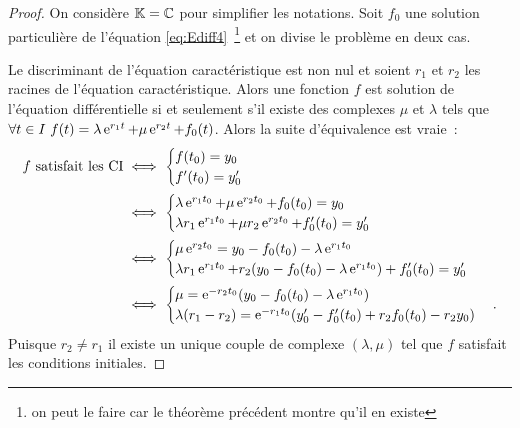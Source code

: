 \begin{proof}
On considère \(\mathbb{K}=\mathbb{C}\) pour simplifier les notations. Soit \(f_0\) une solution particulière de l'équation \eqref{eq:Ediff4}~\footnote{on peut le faire car le théorème précédent montre qu'il en existe} et on divise le problème en deux cas.

Le discriminant de l'équation caractéristique est non nul et soient \(r_1\) et \(r_2\) les racines de l'équation caractéristique. Alors une fonction \(f\) est solution de l'équation différentielle si et seulement s'il existe des complexes \(\mu\) et \(\lambda\) tels que \(\forall t \in I \ f(t)=\lambda \operatorname{e}^{r_1 t}+ \mu \operatorname{e}^{r_2 t} + f_0(t)\). Alors la suite d'équivalence est vraie~:
  \begin{align}
    f \text{~satisfait les CI} &\iff  \begin{cases}f(t_0)=y_0 \\ f'(t_0)=y'_0 \end{cases}\\
    &\iff  \begin{cases}\lambda \operatorname{e}^{r_1 t_0}+ \mu \operatorname{e}^{r_2 t_0} + f_0(t_0)=y_0 \\ \lambda r_1 \operatorname{e}^{r_1 t_0}+ \mu r_2 \operatorname{e}^{r_2 t_0} + f_0'(t_0)=y'_0 \end{cases}\\ 
    &\iff  \begin{cases}\mu\operatorname{e}^{r_2t_0}=y_0-f_0(t_0)-\lambda \operatorname{e}^{r_1t_0} \\ \lambda r_1 \operatorname{e}^{r_1t_0}+r_2(y_0-f_0(t_0)-\lambda\operatorname{e}^{r_1t_0})+f'_0(t_0)=y'_0 \end{cases}\\ 
    &\iff \begin{cases} \mu=\operatorname{e}^{-r_2t_0}(y_0-f_0(t_0)-\lambda \operatorname{e}^{r_1t_0}) \\ \lambda(r_1-r_2)=\operatorname{e}^{-r_1t_0}(y'_0-f'_0(t_0)+r_2f_0(t_0)-r_2y_0)\end{cases}.
  \end{align}
Puisque \(r_2 \neq r_1\) il existe un unique couple de complexe \((\lambda, \mu)\) tel que \(f\) satisfait les conditions initiales.


\end{proof}
